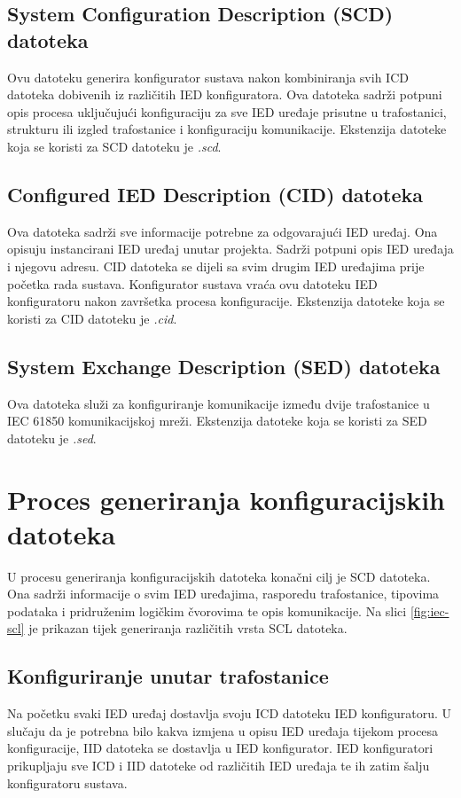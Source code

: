 \documentclass[times, utf8, zavrsni]{fer}
\begin{document}
\subsection{System Configuration Description (SCD) datoteka}
Ovu datoteku generira konfigurator sustava nakon kombiniranja svih ICD datoteka dobivenih iz različitih IED konfiguratora. Ova datoteka sadrži potpuni opis procesa uključujući konfiguraciju za sve IED uređaje prisutne u trafostanici, strukturu ili izgled trafostanice i konfiguraciju komunikacije. Ekstenzija datoteke koja se koristi za SCD datoteku je \textit{.scd}.

\subsection{Configured IED Description (CID) datoteka}
Ova datoteka sadrži sve informacije potrebne za odgovarajući IED uređaj. Ona opisuju instancirani IED uređaj unutar projekta. Sadrži potpuni opis IED uređaja i njegovu adresu. CID datoteka se dijeli sa svim drugim IED uređajima prije početka rada sustava. Konfigurator sustava vraća ovu datoteku IED konfiguratoru nakon završetka procesa konfiguracije. Ekstenzija datoteke koja se koristi za CID datoteku je \textit{.cid}.

\subsection{System Exchange Description (SED) datoteka}
Ova datoteka služi za konfiguriranje komunikacije između dvije trafostanice u IEC 61850 komunikacijskoj mreži. Ekstenzija datoteke koja se koristi za SED datoteku je \textit{.sed}.

\section{Proces generiranja konfiguracijskih datoteka}
U procesu generiranja konfiguracijskih datoteka konačni cilj je SCD datoteka. Ona sadrži informacije o svim IED uređajima, rasporedu trafostanice, tipovima podataka i pridruženim logičkim čvorovima te opis komunikacije. Na slici \ref{fig:iec-scl} je prikazan tijek generiranja različitih vrsta SCL datoteka.

\subsection{Konfiguriranje unutar trafostanice}
Na početku svaki IED uređaj dostavlja svoju ICD datoteku IED konfiguratoru. U slučaju da je potrebna bilo kakva izmjena u opisu IED uređaja tijekom procesa konfiguracije, IID datoteka se dostavlja u IED konfigurator. IED konfiguratori prikupljaju sve ICD i IID datoteke od različitih IED uređaja te ih zatim šalju konfiguratoru sustava.
\end{document}
